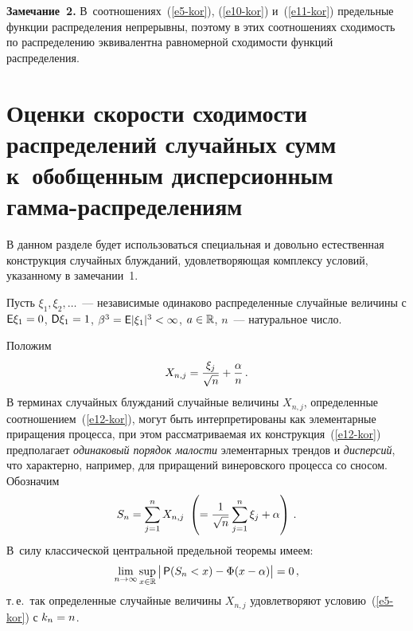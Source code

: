 \begin{multicols}{2}
\smallskip

\noindent
\textbf{Замечание~2.} В~соотношениях~(\ref{e5-kor}), (\ref{e10-kor}) и~(\ref{e11-kor}) предельные
функции распределения непрерывны, поэтому в этих соотношениях
сходимость по распределению эквивалентна равномерной схо\-ди\-мости
функций распределения.

\section{Оценки скорости сходимости распределений случайных сумм к~обобщенным дисперсионным 
гамма-распределениям}

В данном разделе будет использоваться специальная и довольно
естественная конструкция случайных блужданий, удовлетворяющая
комплексу условий, указанному в замечании~1.

Пусть $\xi_1,\xi_2,\ldots$~--- независимые одинаково распределенные
случайные величины с ${\sf E}\xi_1\hm=0$, ${\sf D}\xi_1\hm=1$,
$\beta^3\hm={\sf E}|\xi_1|^3\hm<\infty$, $a\hm\in\r$, $n$~--- натуральное
число.

Положим
\begin{equation}
X_{n,j}=\displaystyle\frac{\displaystyle \xi_j\mathstrut}{\displaystyle \sqrt{n}\mathstrut}+\displaystyle\frac{\displaystyle \alpha\mathstrut}{\displaystyle n\mathstrut}\,.\label{e12-kor}
\end{equation}
В терминах случайных блужданий случайные величины $X_{n,j}$,
определенные соотношением~(\ref{e12-kor}), могут быть интерпретированы как
элементарные приращения процесса, при этом рассматриваемая их
конструкция~(\ref{e12-kor}) предполагает {\it одинаковый порядок малости}
элементарных трендов и {\it дисперсий}, что характерно, например,
для приращений винеровского процесса со сносом. Обозначим
$$
S_n=\sum\limits_{j=1}^n X_{n,j}\
\left(=\displaystyle\frac{\displaystyle 1\mathstrut}{\displaystyle \sqrt{n}\mathstrut}\sum\limits_{j=1}^n\xi_j+\alpha\right)\,.
$$
В~силу классической центральной предельной теоремы имеем:
$$
\lim\limits_{n\to\infty}\sup\limits_{x\in\mathbb{R}}\big|\,{\sf
P}(S_n<x)-\Phi(x-\alpha)\big|=0\,,
$$
т.\,е.\ так определенные случайные величины $X_{n,j}$ удовлетворяют
условию~(\ref{e5-kor}) с $k_n\hm=n$.


\end{multicols}

